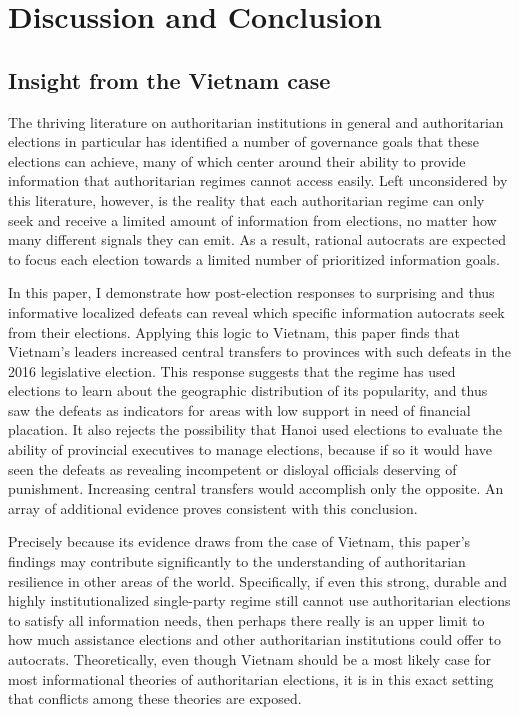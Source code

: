 \documentclass[12pt]{article}
\newcommand{\1}{\mathbbm{1}}
\begin{document}
\section*{Discussion and Conclusion}

\subsection*{Insight from the Vietnam case}

The thriving literature on authoritarian institutions in general and authoritarian elections in particular has identified a number of governance goals that these elections can achieve, many of which center around their ability to provide information that authoritarian regimes cannot access easily. Left unconsidered by this literature, however, is the reality that each authoritarian regime can only seek and receive a limited amount of information from elections, no matter how many different signals they can emit. As a result, rational autocrats are expected to focus each election towards a limited number of prioritized information goals.

In this paper, I demonstrate how post-election responses to surprising and thus informative localized defeats can reveal which specific information autocrats seek from their elections. Applying this logic to Vietnam, this paper finds that Vietnam's leaders increased central transfers to provinces with such defeats in the 2016 legislative election. This response suggests that the regime has used elections to learn about the geographic distribution of its popularity, and thus saw the defeats as indicators for areas with low support in need of financial placation. It also rejects the possibility that Hanoi used elections to evaluate the ability of provincial executives to manage elections, because if so it would have seen the defeats as revealing incompetent or disloyal officials deserving of punishment. Increasing central transfers would accomplish only the opposite. An array of additional evidence proves consistent with this conclusion.

Precisely because its evidence draws from the case of Vietnam, this paper's findings may contribute significantly to the understanding of authoritarian resilience in other areas of the world. Specifically, if even this strong, durable and highly institutionalized single-party regime still cannot use authoritarian elections to satisfy all information needs, then perhaps there really is an upper limit to how much assistance elections and other authoritarian institutions could offer to autocrats. Theoretically, even though Vietnam should be a most likely case for most informational theories of authoritarian elections, it is in this exact setting that conflicts among these theories are exposed.
\end{document}

